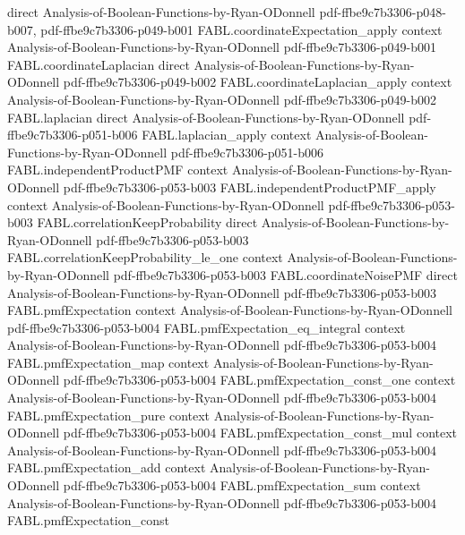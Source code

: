 \begin{theorem}
  {direct}
  {Analysis-of-Boolean-Functions-by-Ryan-ODonnell}
  {pdf-ffbe9c7b3306-p048-b007,
    pdf-ffbe9c7b3306-p049-b001}
\proofstep
  {FABL.coordinateExpectation_apply}
  {context}
  {Analysis-of-Boolean-Functions-by-Ryan-ODonnell}
  {pdf-ffbe9c7b3306-p049-b001}
\proofstep
  {FABL.coordinateLaplacian}
  {direct}
  {Analysis-of-Boolean-Functions-by-Ryan-ODonnell}
  {pdf-ffbe9c7b3306-p049-b002}
\proofstep
  {FABL.coordinateLaplacian_apply}
  {context}
  {Analysis-of-Boolean-Functions-by-Ryan-ODonnell}
  {pdf-ffbe9c7b3306-p049-b002}
\proofstep
  {FABL.laplacian}
  {direct}
  {Analysis-of-Boolean-Functions-by-Ryan-ODonnell}
  {pdf-ffbe9c7b3306-p051-b006}
\proofstep
  {FABL.laplacian_apply}
  {context}
  {Analysis-of-Boolean-Functions-by-Ryan-ODonnell}
  {pdf-ffbe9c7b3306-p051-b006}
\proofstep
  {FABL.independentProductPMF}
  {context}
  {Analysis-of-Boolean-Functions-by-Ryan-ODonnell}
  {pdf-ffbe9c7b3306-p053-b003}
\proofstep
  {FABL.independentProductPMF_apply}
  {context}
  {Analysis-of-Boolean-Functions-by-Ryan-ODonnell}
  {pdf-ffbe9c7b3306-p053-b003}
\proofstep
  {FABL.correlationKeepProbability}
  {direct}
  {Analysis-of-Boolean-Functions-by-Ryan-ODonnell}
  {pdf-ffbe9c7b3306-p053-b003}
\proofstep
  {FABL.correlationKeepProbability_le_one}
  {context}
  {Analysis-of-Boolean-Functions-by-Ryan-ODonnell}
  {pdf-ffbe9c7b3306-p053-b003}
\proofstep
  {FABL.coordinateNoisePMF}
  {direct}
  {Analysis-of-Boolean-Functions-by-Ryan-ODonnell}
  {pdf-ffbe9c7b3306-p053-b003}
\proofstep
  {FABL.pmfExpectation}
  {context}
  {Analysis-of-Boolean-Functions-by-Ryan-ODonnell}
  {pdf-ffbe9c7b3306-p053-b004}
\proofstep
  {FABL.pmfExpectation_eq_integral}
  {context}
  {Analysis-of-Boolean-Functions-by-Ryan-ODonnell}
  {pdf-ffbe9c7b3306-p053-b004}
\proofstep
  {FABL.pmfExpectation_map}
  {context}
  {Analysis-of-Boolean-Functions-by-Ryan-ODonnell}
  {pdf-ffbe9c7b3306-p053-b004}
\proofstep
  {FABL.pmfExpectation_const_one}
  {context}
  {Analysis-of-Boolean-Functions-by-Ryan-ODonnell}
  {pdf-ffbe9c7b3306-p053-b004}
\proofstep
  {FABL.pmfExpectation_pure}
  {context}
  {Analysis-of-Boolean-Functions-by-Ryan-ODonnell}
  {pdf-ffbe9c7b3306-p053-b004}
\proofstep
  {FABL.pmfExpectation_const_mul}
  {context}
  {Analysis-of-Boolean-Functions-by-Ryan-ODonnell}
  {pdf-ffbe9c7b3306-p053-b004}
\proofstep
  {FABL.pmfExpectation_add}
  {context}
  {Analysis-of-Boolean-Functions-by-Ryan-ODonnell}
  {pdf-ffbe9c7b3306-p053-b004}
\proofstep
  {FABL.pmfExpectation_sum}
  {context}
  {Analysis-of-Boolean-Functions-by-Ryan-ODonnell}
  {pdf-ffbe9c7b3306-p053-b004}
\proofstep
  {FABL.pmfExpectation_const}

\end{theorem}
